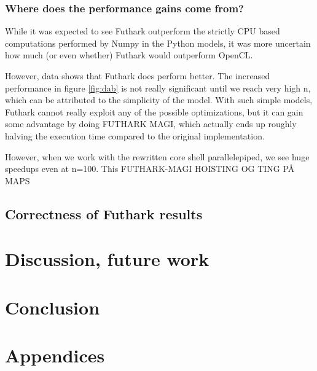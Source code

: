 \documentclass[11pt]{article}
\begin{document}
\subsubsection{Where does the performance gains come from?}
While it was expected to see Futhark outperform the strictly CPU based 
computations performed by Numpy in the Python models, it was more uncertain
how much (or even whether) Futhark would outperform OpenCL.

However, data shows that Futhark does perform better. The increased performance 
in figure \ref{fig:dab} is not really significant until we reach very high n,
which can be attributed to the simplicity of the model. With such simple models,
Futhark cannot really exploit any of the possible optimizations, but it can gain
some advantage by doing FUTHARK MAGI, which actually ends up roughly halving the 
execution time compared to the original implementation.

However, when we work with the rewritten core shell parallelepiped, we see huge
speedups even at n=100. This 
FUTHARK-MAGI HOISTING OG TING PÅ MAPS





\subsection{Correctness of Futhark results}

\section{Discussion, future work}



\section{Conclusion}


\section*{Appendices}
\end{document}

